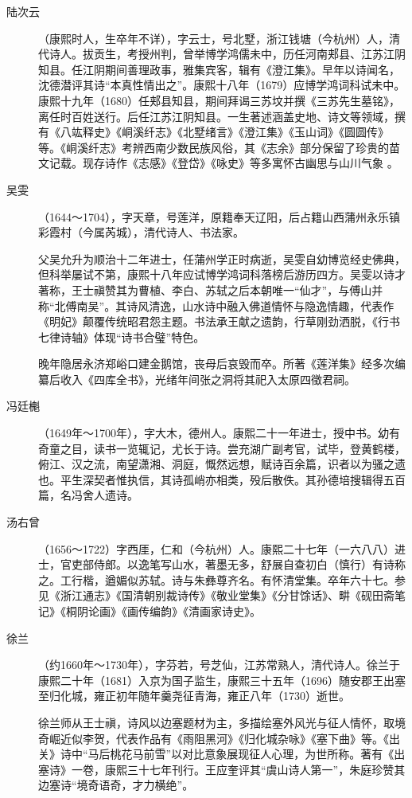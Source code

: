 \begin{description}
  \item[陆次云] （康熙时人，生卒年不详），字云士，号北墅，浙江钱塘（今杭州）人，清代诗人。拔贡生，考授州判，曾举博学鸿儒未中，历任河南郏县、江苏江阴知县。任江阴期间善理政事，雅集宾客，辑有《澄江集》。早年以诗闻名，沈德潜评其诗“本真性情出之”。康熙十八年（1679）应博学鸿词科试未中。康熙十九年（1680）任郏县知县，期间拜谒三苏坟并撰《三苏先生墓铭》，离任时百姓送行。后任江苏江阴知县。一生著述涵盖史地、诗文等领域，撰有《八竑释史》《峒溪纤志》《北墅绪言》《澄江集》《玉山词》《圆圆传》等。《峒溪纤志》考辨西南少数民族风俗，其《志余》部分保留了珍贵的苗文记载。现存诗作《志感》《登岱》《咏史》等多寓怀古幽思与山川气象 。
  \item[吴雯] （1644～1704），字天章，号莲洋，原籍奉天辽阳，后占籍山西蒲州永乐镇彩霞村（今属芮城），清代诗人、书法家。\par
        父吴允升为顺治十二年进士，任蒲州学正时病逝，吴雯自幼博览经史佛典，但科举屡试不第，康熙十八年应试博学鸿词科落榜后游历四方。吴雯以诗才著称，王士禛赞其为曹植、李白、苏轼之后本朝唯一“仙才”，与傅山并称“北傅南吴”。其诗风清逸，山水诗中融入佛道情怀与隐逸情趣，代表作《明妃》颠覆传统昭君怨主题。书法承王献之遗韵，行草刚劲洒脱，《行书七律诗轴》体现“诗书合璧”特色。\par
        晚年隐居永济郑峪口建金鹅馆，丧母后哀毁而卒。所著《莲洋集》经多次编纂后收入《四库全书》，光绪年间张之洞将其祀入太原四徵君祠。
  \item[冯廷櫆] （1649年～1700年），字大木，德州人。康熙二十一年进士，授中书。幼有奇童之目，读书一览辄记，尤长于诗。尝充湖广副考官，试毕，登黄鹤楼，俯江、汉之流，南望潇湘、洞庭，慨然远想，赋诗百余篇，识者以为骚之遗也。平生深契者惟执信，其诗孤峭亦相类，殁后散佚。其孙德培搜辑得五百篇，名冯舍人遗诗。
  \item[汤右曾] （1656～1722）字西厓，仁和（今杭州）人。康熙二十七年（一六八八）进士，官吏部侍郎。以逸笔写山水，著墨无多，舒展自查初白（慎行）有诗称之。工行楷，遒媚似苏轼。诗与朱彝尊齐名。有怀清堂集。卒年六十七。参见《浙江通志》《国清朝别裁诗传》《敬业堂集》《分甘馀话》、畊《砚田斋笔记》《桐阴论画》《画传编韵》《清画家诗史》。
  \item[徐兰] （约1660年～1730年），字芬若，号芝仙，江苏常熟人，清代诗人。徐兰于康熙二十年（1681）入京为国子监生，康熙三十五年（1696）随安郡王出塞至归化城，雍正初年随年羹尧征青海，雍正八年（1730）逝世。\par
        徐兰师从王士禛，诗风以边塞题材为主，多描绘塞外风光与征人情怀，取境奇崛近似李贺，代表作品有《雨阻黑河》《归化城杂咏》《塞下曲》等。《出关》诗中“马后桃花马前雪”以对比意象展现征人心理，为世所称。著有《出塞诗》一卷，康熙三十七年刊行。王应奎评其“虞山诗人第一”，朱庭珍赞其边塞诗“境奇语奇，才力横绝”。

\end{description}
